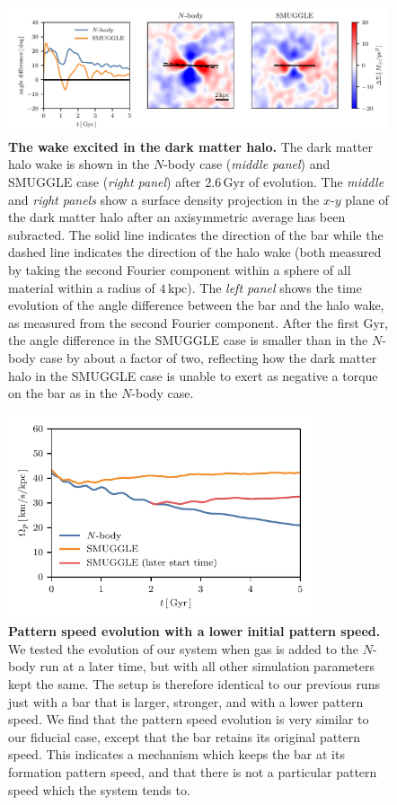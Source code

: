 \documentclass{natureprintstyle}
\newcommand{\Nbody}{$N$-body}
\begin{document}
\begin{figure}[h!]%
\centering
\includegraphics[width=18cm]{fig/fig3.pdf}
\caption{\textbf{The wake excited in the dark matter halo.} The dark matter
halo wake is shown in the \Nbody{} case (\textit{middle panel}) and SMUGGLE case
(\textit{right panel}) after $2.6\,\textrm{Gyr}$ of evolution. The
\textit{middle} and \textit{right panels} show a surface density projection in
the $x$-$y$ plane of the dark matter halo after an axisymmetric average has
been subracted. The solid line indicates the direction of the bar while the
dashed line indicates the direction of the halo wake (both measured by taking
the second Fourier component within a sphere of all material within a radius
of $4\,\textrm{kpc}$). The \textit{left panel} shows the time evolution of
the angle difference between the bar and the halo wake, as measured from the
second Fourier component. After the first Gyr, the angle difference in the
SMUGGLE case is smaller than in the \Nbody{} case by about a factor of two,
reflecting how the dark matter halo in the SMUGGLE case is unable to exert as
negative a torque on the bar as in the \Nbody{} case.}\label{fig:wake}
\end{figure}

\begin{figure}[t!]%
\centering
\includegraphics[width=9cm]{fig/fig-snap700.pdf}
\caption{\textbf{Pattern speed evolution with a lower initial pattern speed.} We
tested the evolution of our system when gas is added to the \Nbody{} run at a
later time, but with all other simulation parameters kept the same. The setup
is therefore identical to our previous runs just with a bar that is larger,
stronger, and with a lower pattern speed. We find that the pattern speed
evolution is very similar to our fiducial case, except that the bar retains
its original pattern speed. This indicates a mechanism which keeps the bar at
its formation pattern speed, and that there is not a particular pattern speed
which the system tends to.}
\label{fig:snap700}
\end{figure}
\end{document}
